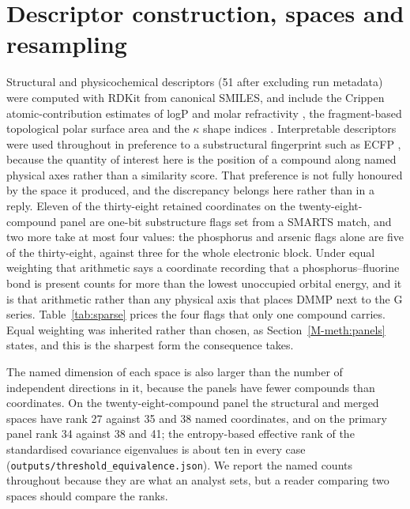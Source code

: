 \documentclass[11pt,a4paper]{article}
\begin{document}
\section{Descriptor construction, spaces and resampling}
\label{meth:descriptors}

Structural and physicochemical descriptors (51 after excluding run metadata)
were computed with RDKit \cite{rdkit} from canonical SMILES, and include the
Crippen atomic-contribution estimates of logP and molar refractivity
\cite{wildman1999}, the fragment-based topological polar surface area
\cite{ertl2000} and the $\kappa$ shape indices \cite{kier1985}. Interpretable
descriptors were used throughout in preference to a substructural fingerprint
such as ECFP \cite{rogers2010}, because the quantity of interest here is the
position of a compound along named physical axes rather than a similarity score.
That preference is not fully honoured by the space it produced, and the
discrepancy belongs here rather than in a reply. Eleven of the thirty-eight
retained coordinates on the twenty-eight-compound panel are one-bit
substructure flags set from a SMARTS match, and two more take at most four
values: the phosphorus and arsenic flags alone are five of the thirty-eight,
against three for the whole electronic block. Under equal weighting that
arithmetic says a coordinate recording that a phosphorus--fluorine bond is
present counts for more than the lowest unoccupied orbital energy, and it is
that arithmetic rather than any physical axis that places DMMP next to the G
series. Table~\ref{tab:sparse} prices the four flags that only one compound
carries. Equal weighting was inherited rather than chosen, as
Section~\ref{M-meth:panels} states, and this is the sharpest form the
consequence takes.

The named dimension of each space is also larger than the number of independent
directions in it, because the panels have fewer compounds than coordinates.
On the twenty-eight-compound panel the structural and merged spaces have rank
27 against 35 and 38 named coordinates, and on the primary panel rank 34
against 38 and 41; the entropy-based effective rank of the standardised covariance
eigenvalues is about ten in every case
(\texttt{outputs/\allowbreak threshold\_\allowbreak equivalence.json}). We report the named counts
throughout because they are what an analyst sets, but a reader comparing two
spaces should compare the ranks.
\end{document}
